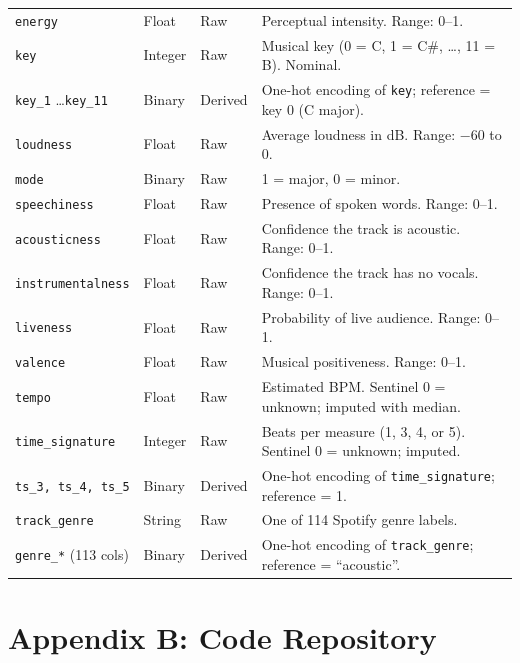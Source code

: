 \documentclass[12pt, oneside]{book}
\begin{document}
\begin{longtable}{p{3.2cm} p{1.6cm} p{2.0cm} p{7.5cm}}
\texttt{energy}            & Float   & Raw     & Perceptual intensity. Range: 0--1. \\
\texttt{key}               & Integer & Raw     & Musical key (0 = C, 1 = C\#, \ldots, 11 = B). Nominal. \\
\texttt{key\_1} \ldots \texttt{key\_11} & Binary & Derived & One-hot encoding of \texttt{key}; reference = key 0 (C major). \\
\texttt{loudness}          & Float   & Raw     & Average loudness in dB. Range: $-$60 to 0. \\
\texttt{mode}              & Binary  & Raw     & 1 = major, 0 = minor. \\
\texttt{speechiness}       & Float   & Raw     & Presence of spoken words. Range: 0--1. \\
\texttt{acousticness}      & Float   & Raw     & Confidence the track is acoustic. Range: 0--1. \\
\texttt{instrumentalness}  & Float   & Raw     & Confidence the track has no vocals. Range: 0--1. \\
\texttt{liveness}          & Float   & Raw     & Probability of live audience. Range: 0--1. \\
\texttt{valence}           & Float   & Raw     & Musical positiveness. Range: 0--1. \\
\texttt{tempo}             & Float   & Raw     & Estimated BPM. Sentinel 0 = unknown; imputed with median. \\
\texttt{time\_signature}   & Integer & Raw     & Beats per measure (1, 3, 4, or 5). Sentinel 0 = unknown; imputed. \\
\texttt{ts\_3, ts\_4, ts\_5} & Binary & Derived & One-hot encoding of \texttt{time\_signature}; reference = 1. \\
\texttt{track\_genre}      & String  & Raw     & One of 114 Spotify genre labels. \\
\texttt{genre\_*} (113 cols) & Binary & Derived & One-hot encoding of \texttt{track\_genre}; reference = ``acoustic''. \\
\end{longtable}
 
\chapter*{Appendix B: Code Repository}
 
\end{document}

